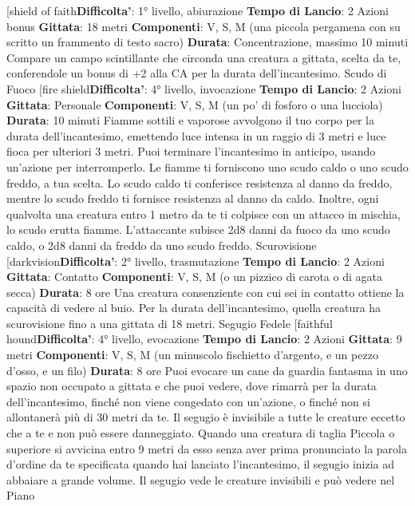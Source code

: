 \begin{multicols}{2}
[shield of faith\textbf{Difficolta'}:
1° livello, abiurazione
\textbf{Tempo di Lancio}: 2 Azioni bonus
\textbf{Gittata}: 18 metri
\textbf{Componenti}: V, S, M (una piccola pergamena con su
scritto un frammento di testo sacro)
\textbf{Durata}: Concentrazione, massimo 10 minuti
Compare un campo scintillante che circonda una
creatura a gittata, scelta da te, conferendole un bonus
di +2 alla CA per la durata dell’incantesimo.
Scudo di Fuoco
[fire shield\textbf{Difficolta'}:
4° livello, invocazione
\textbf{Tempo di Lancio}: 2 Azioni
\textbf{Gittata}: Personale
\textbf{Componenti}: V, S, M (un po’ di fosforo o una lucciola)
\textbf{Durata}: 10 minuti
Fiamme sottili e vaporose avvolgono il tuo corpo per la
durata dell’incantesimo, emettendo luce intensa in un
raggio di 3 metri e luce fioca per ulteriori 3 metri. Puoi
terminare l’incantesimo in anticipo, usando un’azione
per interromperlo.
Le fiamme ti forniscono uno scudo caldo o uno scudo
freddo, a tua scelta. Lo scudo caldo ti conferisce
resistenza al danno da freddo, mentre lo scudo freddo ti
fornisce resistenza al danno da caldo.
Inoltre, ogni qualvolta una creatura entro 1 metro da te
ti colpisce con un attacco in mischia, lo scudo erutta
fiamme. L’attaccante subisce 2d8 danni da fuoco da
uno scudo caldo, o 2d8 danni da freddo da uno scudo
freddo.
Scurovisione
[darkvision\textbf{Difficolta'}:
2° livello, trasmutazione
\textbf{Tempo di Lancio}: 2 Azioni
\textbf{Gittata}: Contatto
\textbf{Componenti}: V, S, M (o un pizzico di carota o di agata
secca)
\textbf{Durata}: 8 ore
Una creatura consenziente con cui sei in contatto
ottiene la capacità di vedere al buio. Per la durata
dell’incantesimo, quella creatura ha scurovisione fino a
una gittata di 18 metri.
Segugio Fedele
[faithful hound\textbf{Difficolta'}:
4° livello, evocazione
\textbf{Tempo di Lancio}: 2 Azioni
\textbf{Gittata}: 9 metri
\textbf{Componenti}: V, S, M (un minuscolo fischietto
d’argento, e un pezzo d’osso, e un filo)
\textbf{Durata}: 8 ore
Puoi evocare un cane da guardia fantasma in uno
spazio non occupato a gittata e che puoi vedere, dove
rimarrà per la durata dell’incantesimo, finché non viene
congedato con un’azione, o finché non si allontanerà
più di 30 metri da te.
Il segugio è invisibile a tutte le creature eccetto che a te
e non può essere danneggiato. Quando una creatura di
taglia Piccola o superiore si avvicina entro 9 metri da
esso senza aver prima pronunciato la parola d’ordine
da te specificata quando hai lanciato l’incantesimo, il
segugio inizia ad abbaiare a grande volume. Il segugio
vede le creature invisibili e può vedere nel Piano

\end{multicols}

